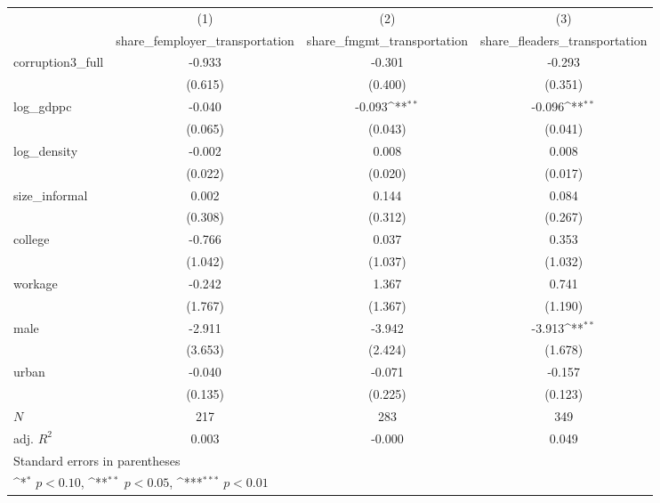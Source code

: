 {
\def\sym#1{\ifmmode^{#1}\else\(^{#1}\)\fi}
\begin{tabular}{l*{3}{c}}
\hline\hline
            &\multicolumn{1}{c}{(1)}&\multicolumn{1}{c}{(2)}&\multicolumn{1}{c}{(3)}\\
            &\multicolumn{1}{c}{share\_femployer\_transportation}&\multicolumn{1}{c}{share\_fmgmt\_transportation}&\multicolumn{1}{c}{share\_fleaders\_transportation}\\
\hline
corruption3\_full&      -0.933         &      -0.301         &      -0.293         \\
            &     (0.615)         &     (0.400)         &     (0.351)         \\
[1em]
log\_gdppc   &      -0.040         &      -0.093\sym{**} &      -0.096\sym{**} \\
            &     (0.065)         &     (0.043)         &     (0.041)         \\
[1em]
log\_density &      -0.002         &       0.008         &       0.008         \\
            &     (0.022)         &     (0.020)         &     (0.017)         \\
[1em]
size\_informal&       0.002         &       0.144         &       0.084         \\
            &     (0.308)         &     (0.312)         &     (0.267)         \\
[1em]
college     &      -0.766         &       0.037         &       0.353         \\
            &     (1.042)         &     (1.037)         &     (1.032)         \\
[1em]
workage     &      -0.242         &       1.367         &       0.741         \\
            &     (1.767)         &     (1.367)         &     (1.190)         \\
[1em]
male        &      -2.911         &      -3.942         &      -3.913\sym{**} \\
            &     (3.653)         &     (2.424)         &     (1.678)         \\
[1em]
urban       &      -0.040         &      -0.071         &      -0.157         \\
            &     (0.135)         &     (0.225)         &     (0.123)         \\
\hline
\(N\)       &         217         &         283         &         349         \\
adj. \(R^{2}\)&       0.003         &      -0.000         &       0.049         \\
\hline\hline
\multicolumn{4}{l}{\footnotesize Standard errors in parentheses}\\
\multicolumn{4}{l}{\footnotesize \sym{*} \(p<0.10\), \sym{**} \(p<0.05\), \sym{***} \(p<0.01\)}\\
\end{tabular}
}

